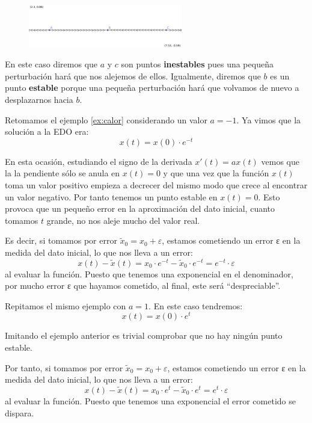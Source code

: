 \begin{figure}[hbtp]
\centering
\includegraphics[width = 0.6\textwidth]{img/diagrama-fases.png}
\end{figure}

En este caso diremos que $a$ y $c$ son puntos \textbf{inestables} pues una pequeña perturbación hará que nos alejemos de ellos. Igualmente, diremos que $b$ es un punto \textbf{estable} porque una pequeña perturbación hará que volvamos de nuevo a desplazarnos hacia $b$.

\begin{example}
Retomamos el ejemplo \ref{ex:calor} considerando un valor $a=-1$. Ya vimos que la solución a la EDO era:
\[x(t) = x(0)\cdot e^{-t}\]

En esta ocasión, estudiando el signo de la derivada $x'(t)=ax(t)$ vemos que la la pendiente sólo se anula en $x(t)=0$ y que una vez que la función $x(t)$ toma un valor positivo empieza a decrecer del mismo modo que crece al encontrar un valor negativo. Por tanto tenemos un punto estable en $x(t)=0$. Esto provoca que un pequeño error en la aproximación del dato inicial, cuanto tomamos $t$ grande, no nos aleje mucho del valor real.

Es decir, si tomamos por error $\tilde{x}_0 = x_0 + ε$, estamos cometiendo un error ε en la medida del dato inicial, lo que nos lleva a un error:
\[x(t)-\tilde{x}(t) = x_0\cdot e^{-t} - \tilde{x}_0\cdot e^{-t} = e^{-t}\cdot ε\]
al evaluar la función. Puesto que tenemos una exponencial en el denominador, por mucho error ε que hayamos cometido, al final, este será ``despreciable''.
\end{example}

\begin{example}
Repitamos el mismo ejemplo con $a=1$. En este caso tendremos:
\[x(t) = x(0)\cdot e^{t}\]

Imitando el ejemplo anterior es trivial comprobar que no hay ningún punto estable.

Por tanto, si tomamos por error $\tilde{x}_0 = x_0 + ε$, estamos cometiendo un error ε en la medida del dato inicial, lo que nos lleva a un error:
\[x(t)-\tilde{x}(t) = x_0\cdot e^{t} - \tilde{x}_0\cdot e^{t} = e^{t}\cdot ε\]
al evaluar la función. Puesto que tenemos una exponencial el error cometido se dispara.
\end{example}

